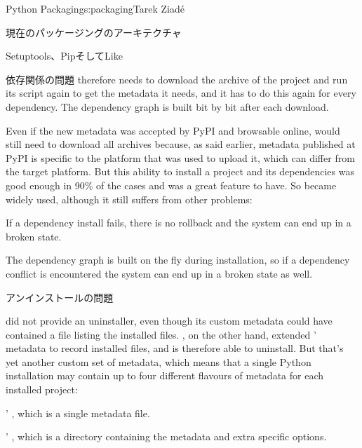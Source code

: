 \begin{aosachapter}{Python Packaging}{s:packaging}{Tarek Ziad\'{e}}
\begin{aosasect1}{現在のパッケージングのアーキテクチャ}
\begin{aosasect2}{Setuptools、PipそしてLike}
\begin{aosasect3}{依存関係の問題}
 therefore needs to download the archive of the
project and run its  script again to get the metadata
it needs, and it has to do this again for every dependency. The
dependency graph is built bit by bit after each download.

Even if the new metadata was accepted by PyPI and browsable online,
 would still need to download all archives
because, as said earlier, metadata published at PyPI is specific to
the platform that was used to upload it, which can differ from the
target platform.  But this ability to install a project and its
dependencies was good enough in 90\% of the cases and was a great
feature to have. So  became widely used, although it
still suffers from other problems:

\begin{aosaitemize}

  \item If a dependency install fails, there is no rollback and the
  system can end up in a broken state.

  \item The dependency graph is built on the fly during installation, so
  if a dependency conflict is encountered the system can end up in a
  broken state as well.

\end{aosaitemize}

\end{aosasect3}

\begin{aosasect3}{アンインストールの問題}

 did not provide an uninstaller, even though its
custom metadata could have contained a file listing the installed
files.  , on the other hand, extended '
metadata to record installed files, and is therefore able to
uninstall.  But that's yet another custom set of metadata, which means
that a single Python installation may contain up to four different
flavours of metadata for each installed project:

\begin{aosaitemize}

  \item {}' , which is a single metadata
  file.

  \item {}' , which is a directory
  containing the metadata and extra  specific
  options.


\end{aosaitemize}
\end{aosasect3}
\end{aosasect2}
\end{aosasect1}
\end{aosachapter}

